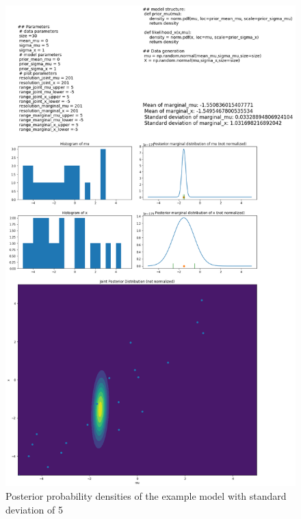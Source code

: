\documentclass{article}
\begin{document}
\begin{figure}
	\includegraphics[width=\textwidth]{images/ground_truth_posterior_4.png}
	\caption[Posterior probability densities of the example model with standard deviation of 5]{Posterior probability densities of the example model with standard deviation of 5}
	\label{fig:ground_truth_posterior_4}
\end{figure}
\end{document}

